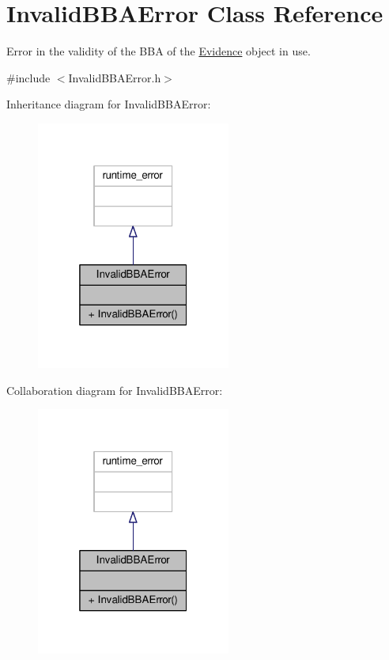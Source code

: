 \hypertarget{classInvalidBBAError}{}\section{Invalid\+B\+B\+A\+Error Class Reference}
\label{classInvalidBBAError}


Error in the validity of the B\+B\+A of the \hyperlink{classEvidence}{Evidence} object in use.  




{\ttfamily \#include $<$Invalid\+B\+B\+A\+Error.\+h$>$}



Inheritance diagram for Invalid\+B\+B\+A\+Error\+:\nopagebreak
\begin{figure}[H]
\begin{center}
\leavevmode
\includegraphics[width=181pt]{classInvalidBBAError__inherit__graph}
\end{center}
\end{figure}


Collaboration diagram for Invalid\+B\+B\+A\+Error\+:\nopagebreak
\begin{figure}[H]
\begin{center}
\leavevmode
\includegraphics[width=181pt]{classInvalidBBAError__coll__graph}
\end{center}
\end{figure}
